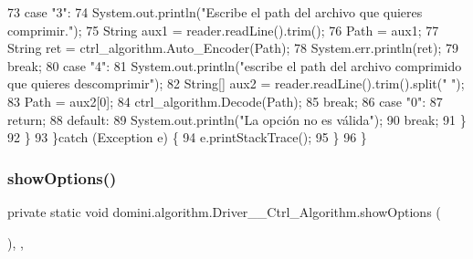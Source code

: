 \begin{DoxyCode}
73                 \textcolor{keywordflow}{case} \textcolor{stringliteral}{"3"}:
74                     System.out.println(\textcolor{stringliteral}{"Escribe el path del archivo que quieres comprimir."});
75                     String aux1 = reader.readLine().trim();
76                     Path = aux1;
77                     String ret = ctrl\_algorithm.Auto\_Encoder(Path);
78                     System.err.println(ret);
79                 \textcolor{keywordflow}{break};
80                 \textcolor{keywordflow}{case} \textcolor{stringliteral}{"4"}:
81                     System.out.println(\textcolor{stringliteral}{"escribe el path del archivo comprimido que quieres descomprimir"});
82                     String[] aux2 = reader.readLine().trim().split(\textcolor{stringliteral}{" "});
83                     Path = aux2[0];
84                     ctrl\_algorithm.Decode(Path);
85                 \textcolor{keywordflow}{break};
86                 \textcolor{keywordflow}{case} \textcolor{stringliteral}{"0"}:
87                     \textcolor{keywordflow}{return};
88                 \textcolor{keywordflow}{default}:
89                     System.out.println(\textcolor{stringliteral}{"La opción no es válida"});
90                 \textcolor{keywordflow}{break};
91             \}
92         \}
93     \}\textcolor{keywordflow}{catch} (Exception e) \{
94         e.printStackTrace();
95     \}
96     \}
\end{DoxyCode}
\mbox{\label{classdomini_1_1algorithm_1_1Driver____Ctrl__Algorithm_afad303731ad32c08c8dbffbf63b3fd9f}} 
\subsubsection{\texorpdfstring{show\+Options()}{showOptions()}}
{\footnotesize\ttfamily private static void domini.\+algorithm.\+Driver\+\_\+\+\_\+\+Ctrl\+\_\+\+Algorithm.\+show\+Options (\begin{DoxyParamCaption}{ }\end{DoxyParamCaption})\hspace{0.3cm}{\ttfamily [inline]}, {\ttfamily [static]}, {\ttfamily [private]}}




